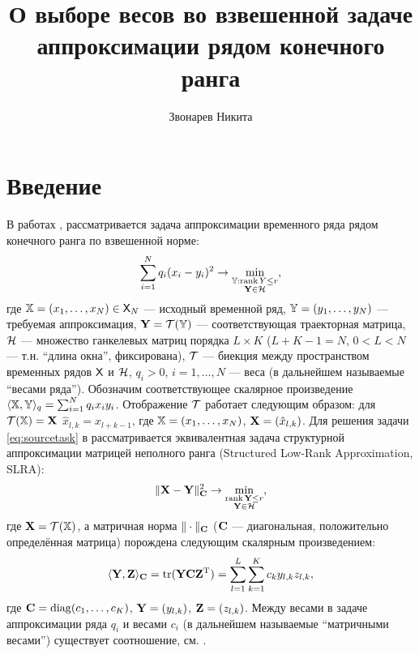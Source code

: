 \documentclass[10pt]{article}
\author{Звонарев Никита}
\title{О выборе весов во взвешенной задаче аппроксимации рядом конечного ранга}
\DeclareMathOperator{\tr}{tr}
\def\rank{\mathop{\mathrm{rank}}}
\begin{document}
\maketitle

\section*{Введение}
В работах \cite{Zvonarev2015}, \cite{Gillard2014} рассматривается задача аппроксимации временного ряда рядом конечного ранга по взвешенной норме:
\begin{equation}\label{eq:sourcetask}
\sum_{i = 1}^N q_i (x_i - y_i)^2 \to \min_{\substack{\tsY: \rank Y \le r \\ \bfY \in \calH}},
\end{equation}
где $\mathbb{X} = (x_1, \ldots, x_N) \in \mathsf{X}_N$ --- исходный временной ряд, $\mathbb{Y} = (y_1, \ldots, y_N)$ --- требуемая аппроксимация, $\mathbf{Y} = \mathcal{T}(\mathbb{Y})$ --- соответствующая траекторная матрица, $\mathcal{H}$ --- множество ганкелевых матриц порядка $L \times K$ ($L + K - 1 = N$, $0 < L < N$ --- т.н. ``длина окна'', фиксирована), $\mathcal{T}$ --- биекция между пространством временных рядов $\mathsf{X}$ и $\mathcal{H}$, $q_i > 0$, $i = 1, \ldots, N$ --- веса (в дальнейшем называемые ``весами ряда''). Обозначим соответствующее скалярное произведение $\langle \mathbb{X}, \mathbb{Y} \rangle_q = \sum_{i=1}^N q_i x_i y_i$. Отображение $\mathcal{T}$ работает следующим образом: для $\mathcal{T}(\mathbb{X}) = \mathbf{X}$ $\hat x_{l, k} = x_{l + k - 1}$, где $\mathbb{X} = (x_1, \ldots, x_N)$, $\mathbf{X} = (\hat x_{l, k})$. Для решения задачи \eqref{eq:sourcetask} в \cite{Zvonarev2015} рассматривается эквивалентная задача структурной аппроксимации матрицей неполного ранга (Structured Low-Rank Approximation, SLRA):
\begin{equation*}
	\|\bfX - \bfY\|^2_\bfC \to \min_{\substack{\rank \bfY \le r \\ \bfY \in \calH}},
\end{equation*}
где $\mathbf{X} = \mathcal{T}(\mathbb{X})$, а матричная норма $\|\cdot\|_{\mathbf{C}}$ ($\mathbf{C}$ --- диагональная, положительно определённая матрица) порождена следующим скалярным произведением:
\begin{equation*}
\langle \bfY, \bfZ \rangle_\bfC = \tr(\bfY \bfC \bfZ^\rmT) = \sum_{l=1}^L \sum_{k=1}^K c_k y_{l,k} z_{l, k},
\end{equation*}
где $\mathbf{C} = \mathop{\mathrm{diag}}(c_1, \ldots, c_K)$, $\mathbf{Y} = (y_{l, k})$, $\mathbf{Z} = (z_{l, k})$. Между весами в задаче аппроксимации ряда $q_i$ и весами $c_i$ (в дальнейшем называемые ``матричными весами'') существует соотношение, см. \cite[Proposition 4]{Zvonarev2015}.
\end{document}
